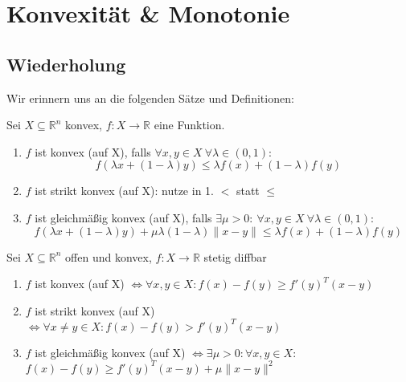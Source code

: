 \chapter{Konvexität \& Monotonie}


\section{Wiederholung}
	Wir erinnern uns an die folgenden Sätze und Definitionen:
	\begin{definition}[Konvexität]
		Sei $X\subseteq\mathbb{R}^n$ konvex, $f : X\to\mathbb{R}$ eine Funktion.
		\begin{enumerate}
			\item $f$ ist konvex (auf X), falls $\forall{}x,y\in{}X \ \forall{} \lambda{}\in{}(0,1):$ \\
			\begin{displaymath}
			f(\lambda{}x+(1-\lambda)y)\leq\lambda{}f(x)+(1-\lambda)f(y)
			\end{displaymath}
			\item $f$ ist strikt konvex (auf X): nutze in 1. \(<\) statt $\leq$
			\item $f$ ist gleichmäßig konvex (auf X), falls $\exists{}\mu{}>0: \ \forall{}x,y\in{}X  \ \forall{}\lambda{}\in(0,1):$ \\
			\begin{equation*}
			f(\lambda{}x+(1-\lambda{})y)+\mu{}\lambda{}(1-\lambda{})\|x-y\|\leq\lambda{}f(x)+(1-\lambda{})f(y)
			\end{equation*}
		\end{enumerate}
	\end{definition}
	
	\begin{satz}
		Sei $X\subseteq\mathbb{R}^n$ offen und konvex, $f : X\to\mathbb{R}$ stetig diffbar
		\begin{enumerate}
			\item $f$ ist konvex (auf X) $ \Leftrightarrow \forall x,y \in X: 		f(x)-f(y)\geq{}f'(y)^T(x-y)$
			\item $f$ ist strikt konvex (auf X) $ \Leftrightarrow\forall x \neq y \in X : f(x)-f(y) > f'(y)^T(x-y)$
			\item $f$ ist gleichmäßig konvex (auf X) $\Leftrightarrow \exists \mu > 0 : \forall x,y \in X:
			$\\$ f(x)-f(y) \geq f'(y)^T(x-y)+ \mu \| x-y \|^2 $
		\end{enumerate}
	\end{satz}
	
